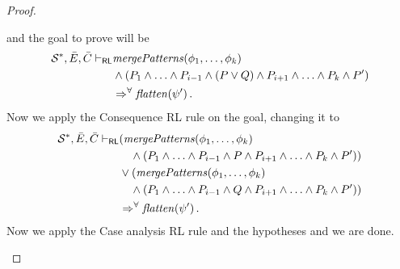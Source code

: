 \documentclass{article}
\newcommand{\RL}{\mathsf{RL}}
\begin{document}
\begin{proof}
\begin{enumerate}
        and the goal to prove will be
        \begin{align*}
            \mathcal{S}^*, \Bar{E}, \Bar{C}
            \vdash_\RL
            & \mathit{mergePatterns}(\phi_1, \ldots, \phi_k)
            \\ & \land (P_1 \land \ldots \land P_{i-1} \land (P \lor Q) \land P_{i+1} \land \ldots \land P_k \land P^\prime) 
            \\ & \Rightarrow^\forall \mathit{flatten}(\psi^\prime) \, .
        \end{align*}
        Now we apply the Consequence RL rule on the goal, changing it to
        \begin{align*}
            \mathcal{S}^*, \Bar{E}, \Bar{C}
            \vdash_\RL
            & (\mathit{mergePatterns}(\phi_1, \ldots, \phi_k)
            \\ & \quad \land (P_1 \land \ldots \land P_{i-1} \land P \land P_{i+1} \land \ldots \land P_k
            \land P^\prime))
            \\ & \lor (\mathit{mergePatterns}(\phi_1, \ldots, \phi_k)
            \\ & \quad \land (P_1 \land \ldots \land P_{i-1} \land Q \land P_{i+1} \land \ldots \land P_k
            \land P^\prime))
            \\ & \Rightarrow^\forall \mathit{flatten}(\psi^\prime) \, .
        \end{align*}
        Now we apply the Case analysis RL rule and the hypotheses and we are done.
    

\end{enumerate}
\end{proof}
\end{document}

